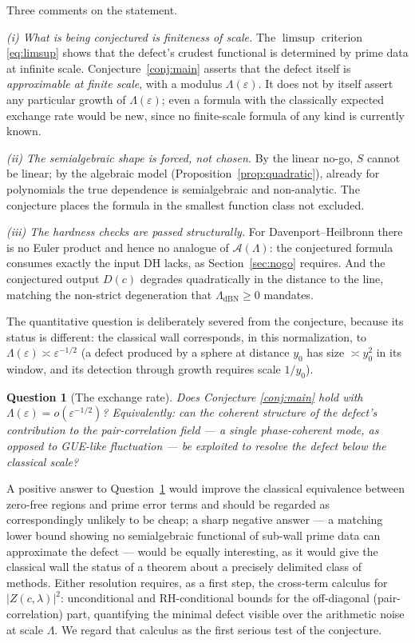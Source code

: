 \documentclass[11pt]{amsart}
\newtheorem{question}[theorem]{Question}
\theoremstyle{definition}
\theoremstyle{remark}
\begin{document}
Three comments on the statement.

\emph{(i) What is being conjectured is finiteness of scale.} The $\limsup$ criterion \eqref{eq:limsup} shows that the defect's crudest functional is determined by prime data at infinite scale. Conjecture~\ref{conj:main} asserts that the defect itself is \emph{approximable at finite scale}, with a modulus $\Lambda(\varepsilon)$. It does not by itself assert any particular growth of $\Lambda(\varepsilon)$; even a formula with the classically expected exchange rate would be new, since no finite-scale formula of any kind is currently known.

\emph{(ii) The semialgebraic shape is forced, not chosen.} By the linear no-go, $S$ cannot be linear; by the algebraic model (Proposition~\ref{prop:quadratic}), already for polynomials the true dependence is semialgebraic and non-analytic. The conjecture places the formula in the smallest function class not excluded.

\emph{(iii) The hardness checks are passed structurally.} For Davenport--Heilbronn there is no Euler product and hence no analogue of $\mathcal A(\Lambda)$: the conjectured formula consumes exactly the input DH lacks, as Section~\ref{sec:nogo} requires. And the conjectured output $D(c)$ degrades quadratically in the distance to the line, matching the non-strict degeneration that $\Lambda_{\mathrm{dBN}}\ge0$ \cite{RodgersTao} mandates.

The quantitative question is deliberately severed from the conjecture, because its status is different: the classical wall corresponds, in this normalization, to $\Lambda(\varepsilon)\asymp\varepsilon^{-1/2}$ (a defect produced by a sphere at distance $y_0$ has size $\asymp y_0^2$ in its window, and its detection through growth requires scale $1/y_0$).

\begin{question}[The exchange rate]\label{q:rate}
Does Conjecture \ref{conj:main} hold with $\Lambda(\varepsilon)=o(\varepsilon^{-1/2})$? Equivalently: can the coherent structure of the defect's contribution to the pair-correlation field --- a single phase-coherent mode, as opposed to GUE-like fluctuation --- be exploited to resolve the defect below the classical scale?
\end{question}

A positive answer to Question~\ref{q:rate} would improve the classical equivalence between zero-free regions and prime error terms and should be regarded as correspondingly unlikely to be cheap; a sharp negative answer --- a matching lower bound showing no semialgebraic functional of sub-wall prime data can approximate the defect --- would be equally interesting, as it would give the classical wall the status of a theorem about a precisely delimited class of methods. Either resolution requires, as a first step, the cross-term calculus for $|Z(c,\lambda)|^2$: unconditional and RH-conditional bounds for the off-diagonal (pair-correlation) part, quantifying the minimal defect visible over the arithmetic noise at scale $\Lambda$. We regard that calculus as the first serious test of the conjecture.
\end{document}
